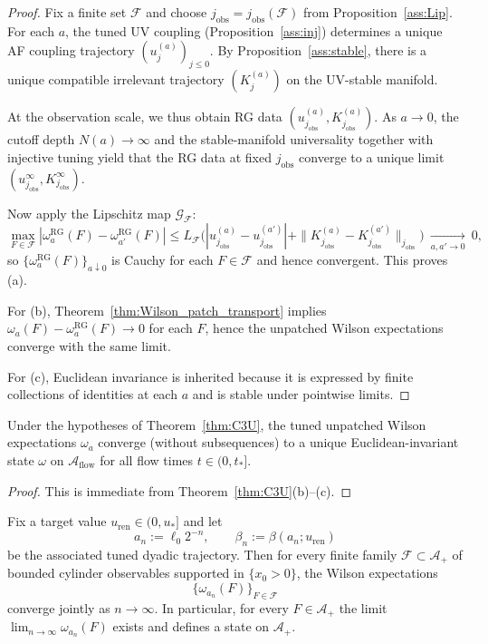 \begin{proof}
Fix a finite set $\mathcal F$ and choose $j_{\mathrm{obs}}=j_{\mathrm{obs}}(\mathcal F)$ from Proposition~\ref{ass:Lip}.
For each $a$, the tuned UV coupling (Proposition~\ref{ass:inj}) determines a unique AF coupling trajectory $(u^{(a)}_j)_{j\le 0}$.
By Proposition~\ref{ass:stable}, there is a unique compatible irrelevant trajectory $(K^{(a)}_j)$ on the UV-stable manifold.

At the observation scale, we thus obtain RG data $(u^{(a)}_{j_{\mathrm{obs}}},K^{(a)}_{j_{\mathrm{obs}}})$.
As $a\to 0$, the cutoff depth $N(a)\to\infty$ and the stable-manifold universality together with injective tuning yield that the RG data at fixed $j_{\mathrm{obs}}$
converge to a unique limit $(u^\infty_{j_{\mathrm{obs}}},K^\infty_{j_{\mathrm{obs}}})$.

Now apply the Lipschitz map $\mathcal G_{\mathcal F}$:
\[
\max_{F\in\mathcal F}|\omega^{\mathrm{RG}}_a(F)-\omega^{\mathrm{RG}}_{a'}(F)|
\le
L_{\mathcal F}\Big(|u^{(a)}_{j_{\mathrm{obs}}}-u^{(a')}_{j_{\mathrm{obs}}}|+\|K^{(a)}_{j_{\mathrm{obs}}}-K^{(a')}_{j_{\mathrm{obs}}}\|_{j_{\mathrm{obs}}}\Big)\ \xrightarrow[a,a'\to 0]{}\ 0,
\]
so $\{\omega^{\mathrm{RG}}_a(F)\}_{a\downarrow0}$ is Cauchy for each $F\in\mathcal F$ and hence convergent. This proves (a).

For (b), Theorem~\ref{thm:Wilson_patch_transport} implies $\omega_a(F)-\omega_a^{\mathrm{RG}}(F)\to 0$ for each $F$, hence the unpatched Wilson expectations converge with the same limit.

For (c), Euclidean invariance is inherited because it is expressed by finite collections of identities at each $a$
and is stable under pointwise limits.
\end{proof}

\begin{corollary}\label{cor:flow_state}
Under the hypotheses of Theorem~\ref{thm:C3U}, the tuned unpatched Wilson expectations $\omega_a$ converge (without subsequences) to a unique Euclidean-invariant state
$\omega$ on $\mathcal A_{\mathrm{flow}}$ for all flow times $t\in(0,t_\ast]$.
\end{corollary}

\begin{proof}
This is immediate from Theorem~\ref{thm:C3U}(b)--(c).
\end{proof}

\begin{corollary}\label{cor:C3U_Aplus_tuned}
Fix a target value $u_{\mathrm{ren}}\in(0,u_\ast]$ and let
\[
a_n:=\ell_0 2^{-n},\qquad \beta_n:=\beta(a_n;u_{\mathrm{ren}})
\]
be the associated tuned dyadic trajectory.
Then for every finite family $\mathcal F\subset\mathcal A_+$ of bounded cylinder observables supported in $\{x_0>0\}$, the Wilson expectations
\[
\{\omega_{a_n}(F)\}_{F\in\mathcal F}
\]
converge jointly as $n\to\infty$.
In particular, for every $F\in\mathcal A_+$ the limit $\lim_{n\to\infty}\omega_{a_n}(F)$ exists and defines a state on $\mathcal A_+$.
\end{corollary}


